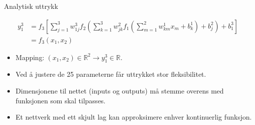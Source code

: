 \documentclass{beamer}
\begin{document}
\begin{frame}{Analytisk uttrykk}

\begin{align*}
  y_1^3 &= f_3\left[\sum_{j=1}^3 w_{1j}^3 f_2\left(\sum_{k=1}^3 w_{jk}^2 f_1\left(\sum_{m=1}^2 w_{km}^1 x_m + b_k^1\right) + b_j^2\right)
  + b_1^3\right] \\
  &= f_3(x_1, x_2)
\end{align*}
\begin{itemize}
 \item Mapping: $(x_1, x_2) \in \mathbb{R}^2  \rightarrow y_1^3 \in \mathbb{R}$. 
 \item Ved å justere de 25 parameterne får uttrykket stor fleksibilitet. 
 \item Dimensjonene til nettet (inputs og outputs) må stemme overens med funksjonen som skal tilpasses.
 \item Et nettverk med ett skjult lag kan approksimere enhver kontinuerlig funksjon. 
\end{itemize}


\end{frame}
\end{document}
